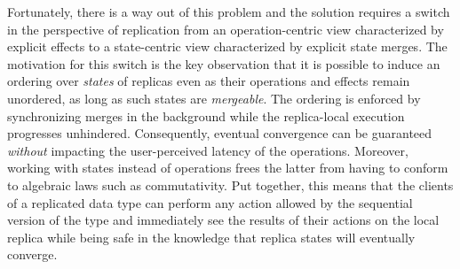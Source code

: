 Fortunately, there is a way out of this problem and the solution
requires a switch in the perspective of replication from an
operation-centric view characterized by explicit effects to a
state-centric view characterized by explicit state merges. The
motivation for this switch is the key observation that it is possible
to induce an ordering over \emph{states} of replicas even as their
operations and effects remain unordered, as long as such states are
\emph{mergeable}. The ordering is enforced by synchronizing merges in
the background while the replica-local execution progresses
unhindered. Consequently, eventual convergence can be guaranteed
\emph{without} impacting the user-perceived latency of the operations.
Moreover, working with states instead of operations frees the latter
from having to conform to algebraic laws such as commutativity.  Put
together, this means that the clients of a replicated data type can
perform any action allowed by the sequential version of the type and
immediately see the results of their actions on the local replica
while being safe in the knowledge that replica states will eventually
converge.

